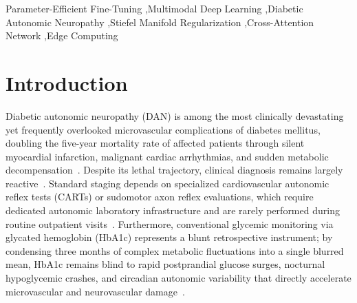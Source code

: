\documentclass[a4paper,fleqn]{cas-dc}
\begin{document}
\begin{keywords}
Parameter-Efficient Fine-Tuning \sep Multimodal Deep Learning \sep Diabetic Autonomic Neuropathy \sep Stiefel Manifold Regularization \sep Cross-Attention Network \sep Edge Computing
\end{keywords}

\maketitle

\section{Introduction}
\label{sec:intro}
Diabetic autonomic neuropathy (DAN) is among the most clinically devastating yet frequently overlooked microvascular complications of diabetes mellitus, doubling the five-year mortality rate of affected patients through silent myocardial infarction, malignant cardiac arrhythmias, and sudden metabolic decompensation~\cite{vinik2003diabetic,tesfaye2010diabetic,maser2003association}. Despite its lethal trajectory, clinical diagnosis remains largely reactive~\cite{spallone2011cardiovascular}. Standard staging depends on specialized cardiovascular autonomic reflex tests (CARTs) or sudomotor axon reflex evaluations, which require dedicated autonomic laboratory infrastructure and are rarely performed during routine outpatient visits~\cite{boulton2005diabetic}. Furthermore, conventional glycemic monitoring via glycated hemoglobin (HbA1c) represents a blunt retrospective instrument; by condensing three months of complex metabolic fluctuations into a single blurred mean, HbA1c remains blind to rapid postprandial glucose surges, nocturnal hypoglycemic crashes, and circadian autonomic variability that directly accelerate microvascular and neurovascular damage~\cite{danne2017international,battelino2023continuous}.
\end{document}
